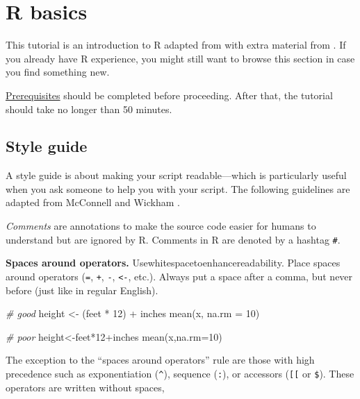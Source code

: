 \documentclass[
]{book}
\newenvironment{Shaded}{\begin{snugshade}}{\end{snugshade}}
\newcommand{\AttributeTok}[1]{\textcolor[rgb]{0.77,0.63,0.00}{#1}}
\newcommand{\CommentTok}[1]{\textcolor[rgb]{0.56,0.35,0.01}{\textit{#1}}}
\newcommand{\DecValTok}[1]{\textcolor[rgb]{0.00,0.00,0.81}{#1}}
\newcommand{\FunctionTok}[1]{\textcolor[rgb]{0.00,0.00,0.00}{#1}}
\newcommand{\NormalTok}[1]{#1}
\newcommand{\OtherTok}[1]{\textcolor[rgb]{0.56,0.35,0.01}{#1}}
\newcommand{\SpecialCharTok}[1]{\textcolor[rgb]{0.00,0.00,0.00}{#1}}
\begin{document}
\hypertarget{r-basics}{%
\section{R basics}\label{r-basics}}

This tutorial is an introduction to R adapted from \citep{Healy:2019:Ch.2} with extra material from \citep{Matloff:2019}. If you already have R experience, you might still want to browse this section in case you find something new.

\protect\hyperlink{prerequisites}{Prerequisites} should be completed before proceeding. After that, the tutorial should take no longer than 50 minutes.

\hypertarget{style-guide}{%
\subsection{Style guide}\label{style-guide}}

A style guide is about making your script readable---which is particularly useful when you ask someone to help you with your script. The following guidelines are adapted from McConnell \citeyearpar{McConnell:2004} and Wickham \citeyearpar{Wickham:2019:styleguide}.

\emph{Comments} are annotations to make the source code easier for humans to understand but are ignored by R. Comments in R are denoted by a hashtag \texttt{\#}.

\textbf{Spaces around operators.} Usewhitespacetoenhancereadability. Place spaces around operators (\texttt{=}, \texttt{+}, \texttt{-}, \texttt{\textless{}-}, etc.). Always put a space after a comma, but never before (just like in regular English).

\begin{Shaded}
\begin{Highlighting}[]
\CommentTok{\# good}
\NormalTok{height }\OtherTok{\textless{}{-}}\NormalTok{ (feet }\SpecialCharTok{*} \DecValTok{12}\NormalTok{) }\SpecialCharTok{+}\NormalTok{ inches}
\FunctionTok{mean}\NormalTok{(x, }\AttributeTok{na.rm =} \DecValTok{10}\NormalTok{)}

\CommentTok{\# poor}
\NormalTok{height}\OtherTok{\textless{}{-}}\NormalTok{feet}\SpecialCharTok{*}\DecValTok{12}\SpecialCharTok{+}\NormalTok{inches}
\FunctionTok{mean}\NormalTok{(x,}\AttributeTok{na.rm=}\DecValTok{10}\NormalTok{)}
\end{Highlighting}
\end{Shaded}

The exception to the ``spaces around operators'' rule are those with high precedence such as exponentiation (\texttt{\^{}}), sequence (\texttt{:}), or accessors (\texttt{{[}{[}} or \texttt{\$}). These operators are written without spaces,
\end{document}
